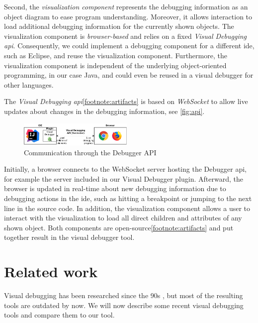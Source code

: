 \documentclass[conference]{IEEEtran}
\begin{document}
Second, the \textit{visualization component} represents the debugging information as an object diagram to ease program understanding.
Moreover, it allows interaction to load additional debugging information for the currently shown objects.
The visualization component is \emph{browser-based} and relies on a fixed \emph{Visual Debugging \gls*{api}}.
Consequently, we could implement a debugging component for a different \gls*{ide}, such as Eclipse, and reuse the visualization component.
Furthermore, the visualization component is independent of the underlying object-oriented programming, in our case Java, and could even be reused in a visual debugger for other  languages.

The \textit{Visual Debugging \gls*{api}}\cref{footnote:artifacts} is based on \emph{WebSocket} to allow live updates about changes in the debugging information, see \autoref{fig:api}.

\begin{figure}[h]
    \centering
    \includegraphics[width=0.488\textwidth]{images/VD-architecture.pdf}
    \caption{Communication through the Debugger API}
    \label{fig:api}
\end{figure}

Initially, a browser connects to the WebSocket server hosting the Debugger \gls*{api}, for example the server included in our Visual Debugger plugin.
Afterward, the browser is updated in real-time about new debugging information due to debugging actions in the \gls*{ide}, such as hitting a breakpoint or jumping to the next line in the source code.
In addition, the visualization component allows a user to interact with the visualization to load all direct children and attributes of any shown object.
Both components are open-source\cref{footnote:artifacts} and put together result in the visual debugger tool.

\section{Related work} \label{sec:relatedWork}
Visual debugging has been researched since the 90s \cite{baeza-yatesVisualDebuggingAutomatic1996, jerdingUsingVisualizationFoster1994, mukherjeaVisualDebuggingIntegrating1994, hansonSimpleExtensibleGraphical1997}, but most of the resulting tools are outdated by now.
We will now describe some recent visual debugging tools and compare them to our tool.
\end{document}
